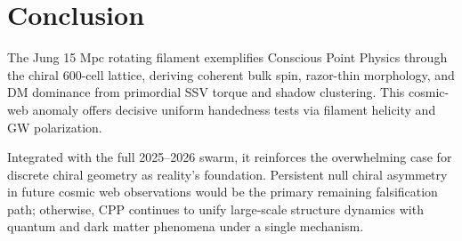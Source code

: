 \documentclass[11pt]{article}
\begin{document}
\section{Conclusion}
The Jung 15 Mpc rotating filament exemplifies Conscious Point Physics through the chiral 600-cell lattice, deriving coherent bulk spin, razor-thin morphology, and DM dominance from primordial SSV torque and shadow clustering. This cosmic-web anomaly offers decisive uniform handedness tests via filament helicity and GW polarization.  

Integrated with the full 2025--2026 swarm, it reinforces the overwhelming case for discrete chiral geometry as reality's foundation. Persistent null chiral asymmetry in future cosmic web observations would be the primary remaining falsification path; otherwise, CPP continues to unify large-scale structure dynamics with quantum and dark matter phenomena under a single mechanism.
\end{document}
